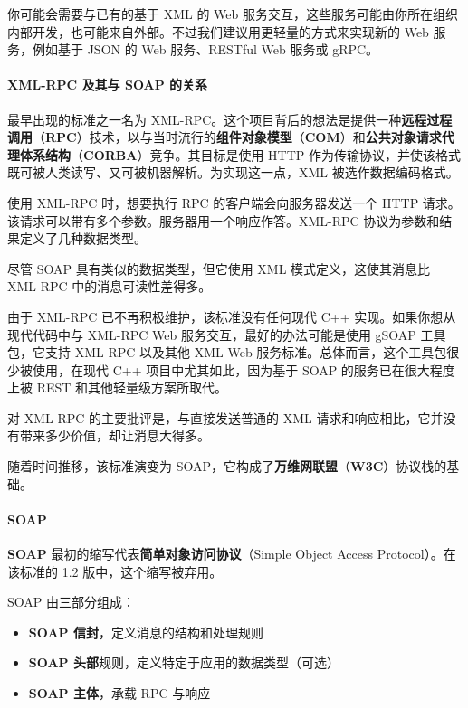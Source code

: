 \label{idx:1585}
你可能会需要与已有的基于 XML 的 Web 服务交互，这些服务可能由你所在组织内部开发，也可能来自外部。不过我们建议用更轻量的方式来实现新的 Web 服务，例如基于 JSON 的 Web 服务、RESTful Web 服务或 gRPC。

\paragraph{XML-RPC 及其与 SOAP 的关系}

\label{idx:1586}
\label{idx:1587}
\label{idx:1588}
\label{idx:1589}
\label{idx:1590}
\label{idx:1591}
最早出现的标准之一名为 XML-RPC。这个项目背后的想法是提供一种\textbf{远程过程调用}（\textbf{RPC}）技术，以与当时流行的\textbf{组件对象模型}（\textbf{COM}）和\textbf{公共对象请求代理体系结构}（\textbf{CORBA}）竞争。其目标是使用 HTTP 作为传输协议，并使该格式既可被人类读写、又可被机器解析。为实现这一点，XML 被选作数据编码格式。

使用 XML-RPC 时，想要执行 RPC 的客户端会向服务器发送一个 HTTP 请求。该请求可以带有多个参数。服务器用一个响应作答。XML-RPC 协议为参数和结果定义了几种数据类型。

尽管 SOAP 具有类似的数据类型，但它使用 XML 模式定义，这使其消息比 XML-RPC 中的消息可读性差得多。

由于 XML-RPC 已不再积极维护，该标准没有任何现代 C++ 实现。如果你想从现代代码中与 XML-RPC Web 服务交互，最好的办法可能是使用 gSOAP 工具包，它支持 XML-RPC 以及其他 XML Web 服务标准。总体而言，这个工具包很少被使用，在现代 C++ 项目中尤其如此，因为基于 SOAP 的服务已在很大程度上被 REST 和其他轻量级方案所取代。

\label{idx:1592}
对 XML-RPC 的主要批评是，与直接发送普通的 XML 请求和响应相比，它并没有带来多少价值，却让消息大得多。

\label{idx:1593}
随着时间推移，该标准演变为 SOAP，它构成了\textbf{万维网联盟}（\textbf{W3C}）协议栈的基础。

\paragraph{SOAP}

\label{idx:1594}
\label{idx:1595}
\textbf{SOAP} 最初的缩写代表\textbf{简单对象访问协议}（Simple Object Access Protocol）。在该标准的 1.2 版中，这个缩写被弃用。

SOAP 由三部分组成：

\begin{itemize}
\label{idx:1596}
\item \textbf{SOAP 信封}，定义消息的结构和处理规则
\label{idx:1597}
\item \textbf{SOAP 头部}规则，定义特定于应用的数据类型（可选）
\label{idx:1598}
\item \textbf{SOAP 主体}，承载 RPC 与响应
\end{itemize}

